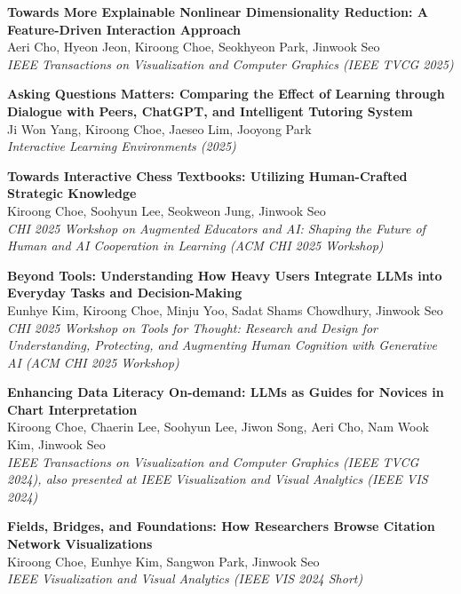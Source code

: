 \documentclass[margin]{res}
\begin{document}
\begin{resume}
\par
\textbf{Towards More Explainable Nonlinear Dimensionality Reduction: A Feature-Driven Interaction Approach}\\
Aeri Cho, Hyeon Jeon, Kiroong Choe, Seokhyeon Park, Jinwook Seo\\
\textit{IEEE Transactions on Visualization and Computer Graphics (IEEE TVCG 2025)}

\par
\textbf{Asking Questions Matters: Comparing the Effect of Learning through Dialogue with Peers, ChatGPT, and Intelligent Tutoring System}\\
Ji Won Yang, Kiroong Choe, Jaeseo Lim, Jooyong Park\\
\textit{Interactive Learning Environments (2025)}

\par
\textbf{Towards Interactive Chess Textbooks: Utilizing Human-Crafted Strategic Knowledge}\\
Kiroong Choe, Soohyun Lee, Seokweon Jung, Jinwook Seo\\
\textit{CHI 2025 Workshop on Augmented Educators and AI: Shaping the Future of Human and AI Cooperation in Learning (ACM CHI 2025 Workshop)}

\par
\textbf{Beyond Tools: Understanding How Heavy Users Integrate LLMs into Everyday Tasks and Decision-Making}\\
Eunhye Kim, Kiroong Choe, Minju Yoo, Sadat Shams Chowdhury, Jinwook Seo\\
\textit{CHI 2025 Workshop on Tools for Thought: Research and Design for Understanding, Protecting, and Augmenting Human Cognition with Generative AI (ACM CHI 2025 Workshop)}

\par
\textbf{Enhancing Data Literacy On-demand: LLMs as Guides for Novices in Chart Interpretation}\\
Kiroong Choe, Chaerin Lee, Soohyun Lee, Jiwon Song, Aeri Cho, Nam Wook Kim, Jinwook Seo\\
\textit{IEEE Transactions on Visualization and Computer Graphics (IEEE TVCG 2024), also presented at IEEE Visualization and Visual Analytics (IEEE VIS 2024)}

\par
\textbf{Fields, Bridges, and Foundations: How Researchers Browse Citation Network Visualizations}\\
Kiroong Choe, Eunhye Kim, Sangwon Park, Jinwook Seo\\
\textit{IEEE Visualization and Visual Analytics (IEEE VIS 2024 Short)}


\end{resume}
\end{document}
